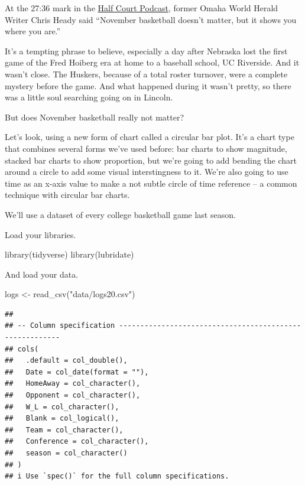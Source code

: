 \documentclass[
]{book}
\newenvironment{Shaded}{\begin{snugshade}}{\end{snugshade}}
\newcommand{\FunctionTok}[1]{\textcolor[rgb]{0.00,0.00,0.00}{#1}}
\newcommand{\NormalTok}[1]{#1}
\newcommand{\OtherTok}[1]{\textcolor[rgb]{0.56,0.35,0.01}{#1}}
\newcommand{\StringTok}[1]{\textcolor[rgb]{0.31,0.60,0.02}{#1}}
\begin{document}
At the 27:36 mark in the \href{https://www.omaha.com/sports/podcasts/half-court-press/half-court-press-creighton-cruises-in-opener-nebraska-stunned-in/article_67081a35-3a8f-5e9e-ae67-e88fcacbb362.html}{Half Court Podcast}, former Omaha World Herald Writer Chris Heady said ``November basketball doesn't matter, but it shows you where you are.''

It's a tempting phrase to believe, especially a day after Nebraska lost the first game of the Fred Hoiberg era at home to a baseball school, UC Riverside. And it wasn't close. The Huskers, because of a total roster turnover, were a complete mystery before the game. And what happened during it wasn't pretty, so there was a little soul searching going on in Lincoln.

But does November basketball really not matter?

Let's look, using a new form of chart called a circular bar plot. It's a chart type that combines several forms we've used before: bar charts to show magnitude, stacked bar charts to show proportion, but we're going to add bending the chart around a circle to add some visual interstingness to it. We're also going to use time as an x-axis value to make a not subtle circle of time reference -- a common technique with circular bar charts.

We'll use a dataset of every college basketball game last season.

Load your libraries.

\begin{Shaded}
\begin{Highlighting}[]
\FunctionTok{library}\NormalTok{(tidyverse)}
\FunctionTok{library}\NormalTok{(lubridate)}
\end{Highlighting}
\end{Shaded}

And load your data.

\begin{Shaded}
\begin{Highlighting}[]
\NormalTok{logs }\OtherTok{\textless{}{-}} \FunctionTok{read\_csv}\NormalTok{(}\StringTok{"data/logs20.csv"}\NormalTok{)}
\end{Highlighting}
\end{Shaded}

\begin{verbatim}
## 
## -- Column specification --------------------------------------------------------
## cols(
##   .default = col_double(),
##   Date = col_date(format = ""),
##   HomeAway = col_character(),
##   Opponent = col_character(),
##   W_L = col_character(),
##   Blank = col_logical(),
##   Team = col_character(),
##   Conference = col_character(),
##   season = col_character()
## )
## i Use `spec()` for the full column specifications.
\end{verbatim}
\end{document}

